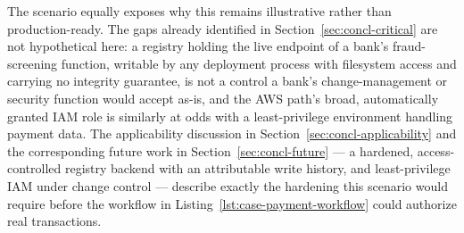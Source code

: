 The scenario equally exposes why this remains illustrative rather than production-ready. The
gaps already identified in Section~\ref{sec:concl-critical} are not hypothetical here: a registry
holding the live endpoint of a bank's fraud-screening function, writable by any deployment process
with filesystem access and carrying no integrity guarantee, is not a control a bank's
change-management or security function would accept as-is, and the AWS path's broad, automatically
granted IAM role is similarly at odds with a least-privilege environment handling payment data.
The applicability discussion in Section~\ref{sec:concl-applicability} and the corresponding future
work in Section~\ref{sec:concl-future} --- a hardened, access-controlled registry backend with an
attributable write history, and least-privilege IAM under change control --- describe exactly the
hardening this scenario would require before the workflow in
Listing~\ref{lst:case-payment-workflow} could authorize real transactions.




























































































